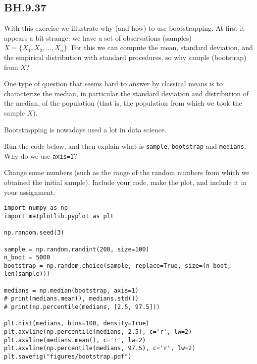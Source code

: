 
\subsection{BH.9.37}

With this exercise we illustrate why (and how) to use bootstrapping. At first it appears a bit strange: we have a set of observations (samples) $X=\{X_{1}, X_2, \ldots, X_{n}\}$. For this we can compute the mean, standard deviation, and the empirical distribution with standard procedures, so why sample (bootstrap) from $X$?

One type of question that seems hard to answer by classical means is to characterize the median, in particular the standard deviation and distribution of the median, of the population (that is, the population from which we took the sample $X$).

Bootstrapping is nowadays used a lot in data science.

\begin{exercise}
Run the code below, and then explain what is \texttt{sample}, \texttt{bootstrap} and \texttt{medians}. Why do we use \texttt{axis=1}?
\end{exercise}

\begin{exercise}
Change some numbers (such as the range of the random numbers from which we obtained the initial sample). Include your code,  make the plot, and include it in your assignment.
\end{exercise}

\begin{verbatim}
import numpy as np
import matplotlib.pyplot as plt

np.random.seed(3)

sample = np.random.randint(200, size=100)
n_boot = 5000
bootstrap = np.random.choice(sample, replace=True, size=(n_boot, len(sample)))

medians = np.median(bootstrap, axis=1)
# print(medians.mean(), medians.std())
# print(np.percentile(medians, [2.5, 97.5]))

plt.hist(medians, bins=100, density=True)
plt.axvline(np.percentile(medians, 2.5), c='r', lw=2)
plt.axvline(medians.mean(), c='r', lw=2)
plt.axvline(np.percentile(medians, 97.5), c='r', lw=2)
plt.savefig("figures/bootstrap.pdf")
\end{verbatim}


